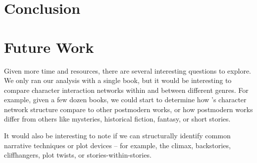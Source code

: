 \section{Conclusion}

\section{Future Work}

Given more time and resources, there are several interesting questions to explore. We only ran our analysis with a single book, but it would be interesting to compare character interaction networks within and between different genres. For example, given a few dozen books, we could start to determine how \infinitejest's character network structure compare to other postmodern works, or how postmodern works differ from others like mysteries, historical fiction, fantasy, or short stories.

It would also be interesting to note if we can structurally identify common narrative techniques or plot devices -- for example, the climax, backstories, cliffhangers, plot twists, or stories-within-stories.



